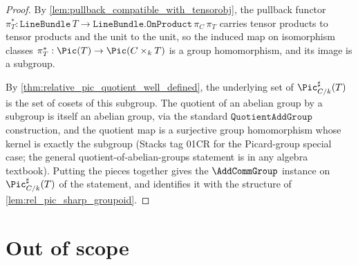 \begin{proof}
  By \cref{lem:pullback_compatible_with_tensorobj}, the pullback functor
  \(\pi_T^{*} : \texttt{LineBundle}\,T \to
   \texttt{LineBundle.OnProduct}\,\pi_C\,\pi_T\) carries tensor products to
  tensor products and the unit to the unit, so the induced map on isomorphism
  classes \(\pi_T^{*} : \Pic(T) \to \Pic(C \times_k T)\) is a group
  homomorphism, and its image is a subgroup.

  By \cref{thm:relative_pic_quotient_well_defined}, the underlying set of
  \(\Pic^{\sharp}_{C/k}(T)\) is the set of cosets of this subgroup. The
  quotient of an abelian group by a subgroup is itself an abelian group, via
  the standard \(\mathtt{QuotientAddGroup}\) construction, and the quotient
  map is a surjective group homomorphism whose kernel is exactly the subgroup
  (Stacks tag 01CR for the Picard-group special case; the general
  quotient-of-abelian-groups statement is in any algebra textbook). Putting
  the pieces together gives the \(\AddCommGroup\) instance on
  \(\Pic^{\sharp}_{C/k}(T)\) of the statement, and identifies it with the
  structure of \cref{lem:rel_pic_sharp_groupoid}.
\end{proof}

\section{Out of scope}
\label{sec:tensorobj_out_of_scope}

